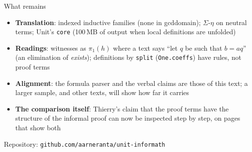\documentclass[10pt,aspectratio=169]{beamer}
\begin{document}
\begin{frame}{What remains}

\small
\begin{itemize}
\item \textbf{Translation}: indexed inductive families (none in
  gcddomain); $\Sigma$-$\eta$ on neutral terms; Unit's \texttt{core}
  (100\,MB of output when local definitions are unfolded)
\item \textbf{Readings}: witnesses as $\pi_1(h)$ where a text says ``let
  $q$ be such that $b = aq$'' (an elimination of \emph{exists});
  definitions by \texttt{split} (\texttt{One.coeffs}) have rules, not
  proof terms
\item \textbf{Alignment}: the formula parser and the verbal claims are
  those of this text; a larger sample, and other texts, will show how far
  it carries
\item \textbf{The comparison itself}: Thierry's claim that the proof
  terms have the structure of the informal proof can now be inspected
  step by step, on pages that show both
\end{itemize}

\vspace{3mm}
\centering
\small Repository: \texttt{github.com/aarneranta/unit-informath}

\end{frame}
\end{document}
